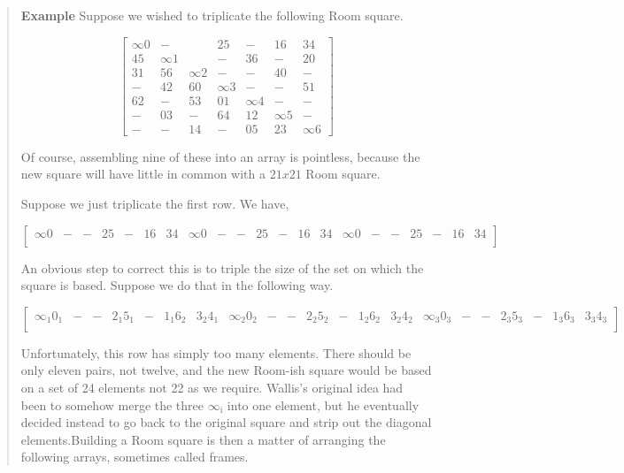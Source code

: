\documentclass[
  11pt,
  a4paper]{book}
\newcounter{examplecounter}
\begin{document}
\begin{quote}  \textbf{Example } \quad 
Suppose we wished to triplicate the following Room square.

\begin{equation}
  \begin{bmatrix}
    ∞0 &   - &     &  25 &   - &  16 &  34 \\
    45 &  ∞1 &     &   - &  36 &   - &  20 \\
    31 &  56 &  ∞2 &   - &   - &  40 &   - \\
     - &  42 &  60 &  ∞3 &   - &   - &  51 \\
    62 &   - &  53 &  01 &  ∞4 &   - &   - \\
     - &  03 &   - &  64 &  12 &  ∞5 &   - \\
     - &   - &  14 &   - &  05 &  23 &  ∞6 
  \end{bmatrix}
  \label{eq:triple-room}
\end{equation}

Of course, assembling nine of these into an array is
pointless, because the new square will have little in common
with a $21 x 21$ Room square.

Suppose we just triplicate the first row. We have,

\begin{equation*}
  \begin{bmatrix}
    \infty 0 & - & - & 25 & - & 16 & 34 & \infty 0 & - & - & 25 & - & 16 & 34 & \infty 0 & - & - & 25 & - & 16 & 34 \\
  \end{bmatrix}
\end{equation*}

An obvious step to correct this is to triple the size of the
set on which the square is based. Suppose we do that in the
following way.

\begin{equation*}
  \begin{bmatrix}
    \infty_{1} 0_{1} & - & - & 2_{1}5_{1} & - & 1_{1}6_{2} & 3_{2}4_{1} & \infty_{2} 0_{2} & - & - & 2_{2}5_{2} & - & 1_{2}6_{2} & 3_{2}4_{2} & \infty_{3} 0_{3} & - & - & 2_{3}5_{3} & - & 1_{3}6_{3} & 3_{3}4_{3} \\
  \end{bmatrix}
\end{equation*}

Unfortunately, this row has simply too many elements. There
should be only eleven pairs, not twelve, and the new
Room-ish square would be based on a set of 24 elements not
22 as we require. Wallis’s original idea had been to somehow
merge the three $\infty _\mathrm{i}$ into one element, but
he eventually decided instead to go back to the original
square and strip out the diagonal elements.Building a Room
square is then a matter of arranging the following arrays,
sometimes called frames.


\end{quote}
\end{document}
